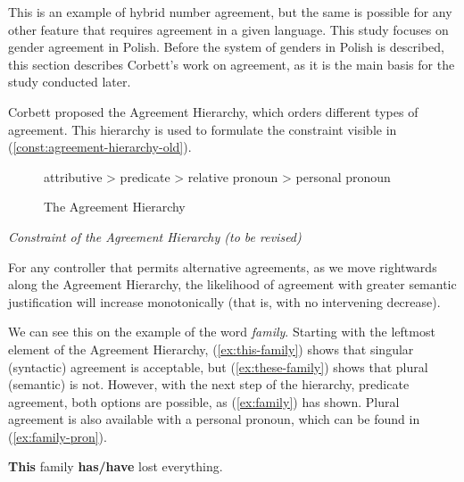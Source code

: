 \begin{exe}
  \ex\label{ex:family}
  \begin{xlist}
    \label{ex:family-have}
    \label{ex:family-has}
  \end{xlist}
\end{exe}

This is an example of hybrid number agreement, but the same is possible for any other feature that requires agreement in a given language. This study focuses on gender agreement in Polish. Before the system of genders in Polish is described, this section describes Corbett's work on agreement, as it is the main basis for the study conducted later.

Corbett proposed the Agreement Hierarchy, which orders different types of agreement. This hierarchy is used to formulate the constraint visible in (\ref{const:agreement-hierarchy-old}).

\begin{figure}[H]
  \centering
  attributive > predicate > relative pronoun > personal pronoun
  \caption{The Agreement Hierarchy \citep{corbett_agreement_1979}}
  \label{fig:agreement-hierarchy}
\end{figure}

\begin{exe}
  \ex\label{const:agreement-hierarchy-old}
  \textit{Constraint of the Agreement Hierarchy (to be revised)}
  
  For any controller that permits alternative agreements, as we move rightwards along the Agreement Hierarchy, the likelihood of agreement with greater semantic justification will increase monotonically (that is, with no intervening decrease).
\end{exe}

We can see this on the example of the word \textsl{family}. Starting with the leftmost element of the Agreement Hierarchy, (\ref{ex:this-family}) shows that singular (syntactic) agreement is acceptable, but (\ref{ex:these-family}) shows that plural (semantic) is not. However, with the next step of the hierarchy, predicate agreement, both options are possible, as (\ref{ex:family}) has shown. Plural agreement is also available with a personal pronoun, which can be found in (\ref{ex:family-pron}).

\begin{exe}
  \ex
  \begin{xlist}
    \ex\label{ex:this-family} \textbf{This} family \textbf{has/have} lost everything.
    \label{ex:these-family}
  \end{xlist}
\end{exe}

